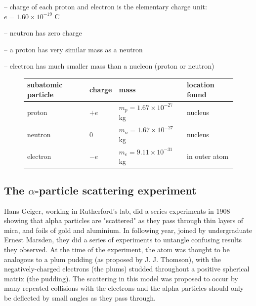 \begin{compactenum}
	\item[--] charge of each proton and electron is the elementary charge unit: $e = 1.60 \times10^{-19} \text{ C}$
	
	\item[--] neutron has zero charge
	
	\item[--] a proton has very similar mass as a neutron
	
	\item[--] electron has much smaller mass than a nucleon (proton or neutron)
\end{compactenum}
\begin{figure}
\begin{center}
	\begin{tabular}{|C{3.5cm}|C{1.6cm}|C{3.5cm}|C{2.8cm}|}
		\hline subatomic particle & charge & mass & location found \\ 
		\hline proton & $+e$ & $m_p = 1.67 \times 10^{-27}$ kg & nucleus \\ 
		\hline neutron & 0 & $m_n = 1.67 \times 10^{-27}$ kg & nucleus \\ 
		\hline electron & $-e$ & $m_e = 9.11 \times 10^{-31}$ kg & in outer atom \\ 
		\hline 
	\end{tabular}
\end{center}
\end{figure}

\subsection{The $\alpha$-particle scattering experiment}

Hans Geiger, working in Rutherford's lab, did a series experiments in 1908 showing that alpha particles are "scattered" as they pass through thin layers of mica, and foils of gold and aluminium. In following year, joined by undergraduate Ernest Marsden, they did a series of experiments to untangle confusing results they observed. At the time of the experiment, the atom was thought to be analogous to a plum pudding (as proposed by J. J. Thomson), with the negatively-charged electrons (the plums) studded throughout a positive spherical matrix (the pudding). The scattering in this model was proposed to occur by many repeated collisions with the electrons and the alpha particles should only be deflected by small angles as they pass through.

